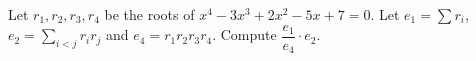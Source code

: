 Let \(r_1,r_2,r_3,r_4\) be the roots of \(x^4-3x^3+2x^2-5x+7=0\). Let \(e_1=\sum r_i\), \(e_2=\sum_{i<j}r_ir_j\) and \(e_4=r_1r_2r_3r_4\). Compute \(\dfrac{e_1}{e_4}\cdot e_2\).
